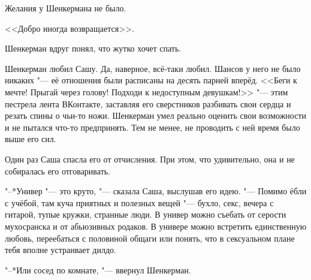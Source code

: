 \hspace{0.2em}






Желания у Шенкермана не было.

\hspace{0.2em}






<<Добро иногда возвращается>>.

Шенкерман вдруг понял, что жутко хочет спать.

\asterism

Шенкерман любил Сашу.
Да, наверное, всё-таки любил.
Шансов у него не было никаких "--- её отношения были расписаны на десять парней вперёд.
<<Беги к мечте!
Прыгай через голову!
Подходи к недоступным девушкам!>> "--- этим пестрела лента ВКонтакте, заставляя его сверстников разбивать свои сердца и резать спины о чьи-то ножи.
Шенкерман умел реально оценить свои возможности и не пытался что-то предпринять.
Тем не менее, не проводить с ней время было выше его сил.

Один раз Саша спасла его от отчисления.
При этом, что удивительно, она и не собиралась его отговаривать.

"--*Универ "--- это круто, "--- сказала Саша, выслушав его идею.
"--- Помимо ёбли с учёбой, там куча приятных и полезных вещей "--- бухло, секс, вечера с гитарой, тупые кружки, странные люди.
В универ можно съебать от серости мухосранска и от абьюзивных родаков.
В универе можно встретить единственную любовь, переебаться с половиной общаги или понять, что в сексуальном плане тебя вполне устраивает дилдо.

"--*Или сосед по комнате, "--- ввернул Шенкерман.

